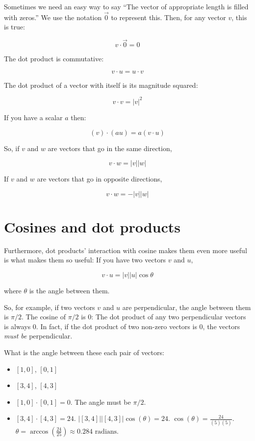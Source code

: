 Sometimes we need an easy way to say ``The vector of appropriate length is filled with zeros.''
We use the notation $\vec{0}$ to represent this. Then, for any vector $v$, this is true:

$$v \cdot \vec{0} = 0$$

The dot product is commutative:

$$v \cdot u = u \cdot v$$

The dot product of a vector with itself is its magnitude squared:

$$ v \cdot v = |v|^2 $$

If you have a scalar $a$ then:

    $$(v) \cdot (a u) = a (v \cdot u)$$

So, if $v$ and $w$ are vectors that go in the same direction,

    $$v \cdot w = |v| |w|$$

If $v$ and $w$ are vectors that go in opposite directions,

    $$v \cdot w = -|v| |w|$$

\section{Cosines and dot products}

Furthermore, dot products' interaction with cosine makes them even more useful is what makes them so useful: 
If you have two vectors $v$ and $u$,

$$v \cdot u = |v| |u| \cos \theta$$

where $\theta$ is the angle between them.

So, for example, if two vectors $v$ and $u$ are perpendicular, the angle between them is $\pi/2$.  
The cosine of $\pi/2$ is 0: The dot product of any two perpendicular vectors is always 0. In fact, if 
the dot product of two non-zero vectors is 0, the vectors \textit{must be} perpendicular.

\begin{Exercise}[title={Using dot products}, label=cos_dot_products]
    What is the angle between these each pair of vectors:
    \begin{itemize}
        \item $[1, 0]$, $[0, 1]$
        \item $[3,4]$, $[4,3]$
    \end{itemize}
\end{Exercise}
\begin{Answer}[ref=cos_dot_products]
        \begin{itemize}
            \item $[1,0] \cdot [0,1] = 0$.  The angle must be $\pi/2$.
            \item $[3,4] \cdot [4, 3] = 24$. $|[3,4]| |[4,3]| \cos(\theta) = 24$. 
            $\cos(\theta) = \frac{24}{(5)(5)}$. $\theta = \arccos(\frac{24}{25}) \approx 0.284 \text{ radians}$.
        \end{itemize}
\end{Answer}

